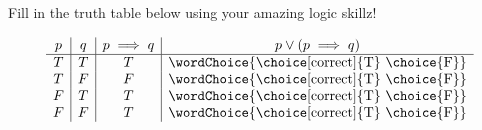 \documentclass{ximera}
\begin{document}
\begin{problem}
Fill in the truth table below using your amazing logic skillz!

\begin{prompt}
\begin{center}
\[
\begin{array}{c|c|c|c}
		p & q & p \implies q & p \vee (p \implies q) \\
		\hline
		T & T & T & \text{\wordChoice{\choice[correct]{T} \choice{F}}} \\
		T & F & F & \text{\wordChoice{\choice[correct]{T} \choice{F}}} \\
		F & T & T & \text{\wordChoice{\choice[correct]{T} \choice{F}}} \\
		F & F & T & \text{\wordChoice{\choice[correct]{T} \choice{F}}}
	\end{array}
    \]
\end{center}
\end{prompt}
\end{problem}
\end{document}
